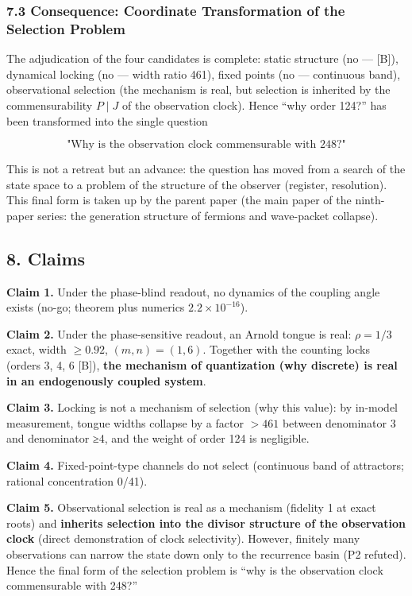 \documentclass[
  a4paper,
]{article}
\begin{document}
\subsubsection{7.3 Consequence: Coordinate Transformation of the
Selection
Problem}\label{consequence-coordinate-transformation-of-the-selection-problem}

The adjudication of the four candidates is complete: static structure
(no --- {[}B{]}), dynamical locking (no --- width ratio 461), fixed
points (no --- continuous band), observational selection (the mechanism
is real, but selection is inherited by the commensurability \(P\mid J\)
of the observation clock). Hence ``why order 124?'' has been transformed
into the single question

\[
\boxed{\text{"Why is the observation clock commensurable with 248?"}}
\]

This is not a retreat but an advance: the question has moved from a
search of the state space to a problem of the structure of the observer
(register, resolution). This final form is taken up by the parent paper
(the main paper of the ninth-paper series: the generation structure of
fermions and wave-packet collapse).

\subsection{8. Claims}\label{claims}

\textbf{Claim 1.} Under the phase-blind readout, no dynamics of the
coupling angle exists (no-go; theorem plus numerics
\(2.2\times10^{-16}\)).

\textbf{Claim 2.} Under the phase-sensitive readout, an Arnold tongue is
real: \(\rho=1/3\) exact, width \(\ge0.92\), \((m,n)=(1,6)\). Together
with the counting locks (orders 3, 4, 6 {[}B{]}), \textbf{the mechanism
of quantization (why discrete) is real in an endogenously coupled
system}.

\textbf{Claim 3.} Locking is not a mechanism of selection (why this
value): by in-model measurement, tongue widths collapse by a factor
\(>461\) between denominator 3 and denominator ≥4, and the weight of
order 124 is negligible.

\textbf{Claim 4.} Fixed-point-type channels do not select (continuous
band of attractors; rational concentration 0/41).

\textbf{Claim 5.} Observational selection is real as a mechanism
(fidelity 1 at exact roots) and \textbf{inherits selection into the
divisor structure of the observation clock} (direct demonstration of
clock selectivity). However, finitely many observations can narrow the
state down only to the recurrence basin (P2 refuted). Hence the final
form of the selection problem is ``why is the observation clock
commensurable with 248?''
\end{document}
